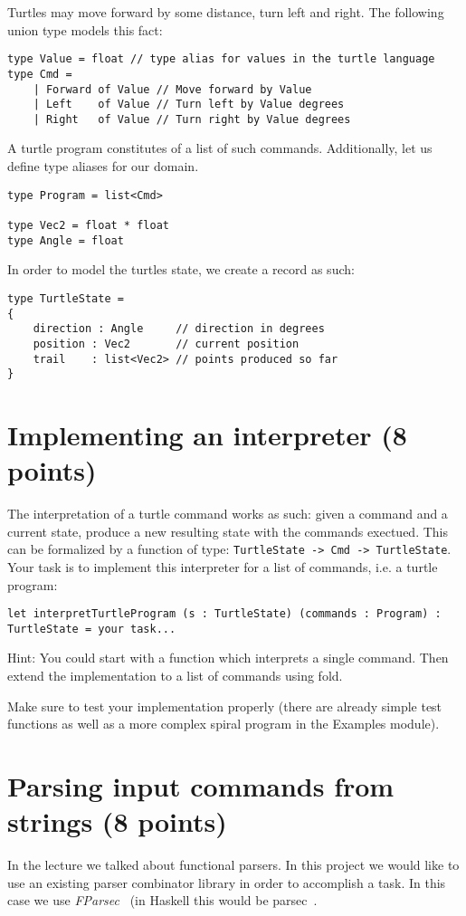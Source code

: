 \documentclass[a4paper]{article}
\begin{document}
Turtles may move forward by some distance, turn left and right. The following union type models this fact:
\begin{verbatim}
type Value = float // type alias for values in the turtle language
type Cmd =
    | Forward of Value // Move forward by Value
    | Left    of Value // Turn left by Value degrees
    | Right   of Value // Turn right by Value degrees
\end{verbatim}
A turtle program constitutes of a list of such commands. Additionally, let us define type aliases for our domain.
\begin{verbatim}
type Program = list<Cmd>

type Vec2 = float * float
type Angle = float
\end{verbatim}
In order to model the turtles state, we create a record as such:
\begin{verbatim}
type TurtleState = 
{
    direction : Angle     // direction in degrees
    position : Vec2       // current position
    trail    : list<Vec2> // points produced so far
}
\end{verbatim}

\section{Implementing an interpreter (8 points)}

The interpretation of a turtle command works as such: given a command and a current state, produce a new resulting state with the commands exectued.
This can be formalized by a function of type: \texttt{TurtleState -> Cmd -> TurtleState}.
Your task is to implement this interpreter for a list of commands, i.e. a turtle program:
\begin{verbatim}
let interpretTurtleProgram (s : TurtleState) (commands : Program) : TurtleState = your task...
\end{verbatim}
Hint: You could start with a function which interprets a single command. Then extend the implementation to a list of commands using fold.

Make sure to test your implementation properly (there are already simple test functions as well as a more complex spiral program in the Examples module).

\section{Parsing input commands from strings (8 points)}

In the lecture we talked about functional parsers. In this project we would like to use an existing parser combinator library in order to
accomplish a task. In this case we use \emph{FParsec}~\cite{FParsecD61:online} (in Haskell this would be parsec~\cite{parsecMo75:online}.
\end{document}
